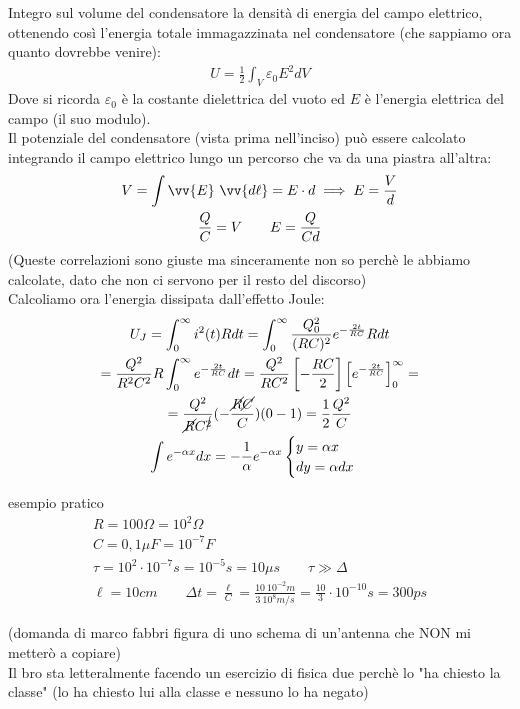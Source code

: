 \documentclass[a4paper, oneside]{article}
\begin{document}
Integro sul volume del condensatore la densità di energia del campo elettrico, ottenendo così l'energia totale immagazzinata nel condensatore (che sappiamo ora quanto dovrebbe venire):
\begin{gather*}
    U = \frac{1}{2} \int_V \varepsilon_0 E^2 dV
\end{gather*}
Dove si ricorda $\varepsilon_0$ è la costante dielettrica del vuoto ed $E$ è l'energia elettrica del campo (il suo modulo).\\
Il potenziale del condensatore (vista prima nell'inciso) può essere calcolato integrando il campo elettrico lungo un percorso che va da una piastra all'altra:
\begin{gather*}
    V = \int \vv{E} \ \vv{d\ell} = E \cdot d \implies E = \frac{V}{d}\\
    \frac{Q}{C} = V \qquad E = \frac{Q}{C d}
\end{gather*}
\scriptsize(Queste correlazioni sono giuste ma sinceramente non so perchè le abbiamo calcolate, dato che non ci servono per il resto del discorso)\\\normalsize
Calcoliamo ora l'energia dissipata dall'effetto Joule:
\begin{gather*}
    U_J = \int_0^\infty i^2(t) R dt = \int_0^\infty \frac{Q_0^2}{(R C)^2} e^{-\frac{2t}{R C}} R dt \\
    = \frac{Q^2}{R^2 C^2} R \int_0^\infty e^{-\frac{2t}{R C}} dt = \frac{Q^2}{R C^2} \left[ -\frac{RC}{2} \right] \left[ e^{-\frac{2t}{RC}} \right]_0^\infty = \\
    = \frac{Q^2}{\cancel{R} C^{\cancel{2}}} (-\frac{\cancel{R}\cancel{C}}{C}) (0-1) = \frac{1}{2} \frac{Q^2}{C}\\
    \int e^{-\alpha x} dx = -\frac{1}{\alpha} e^{-\alpha x}
    \begin{cases}
        y = \alpha x\\
        dy = \alpha dx\\
    \end{cases}
\end{gather*}
\begin{example}
    esempio pratico\\
    \begin{gather*}
        R = 100 \Omega = 10^2 \Omega\\
        C = 0,1 \mu F = 10^{-7} F\\
        \tau = 10^2 \cdot 10^{-7} s = 10^{-5} s = 10 \mu s \qquad \tau \gg \Delta \\
        \ell = 10 cm \qquad \Delta t = \frac{\ell}{C} = \frac{10 \ 10^{-2} m}{3 \ 10^8 m/s} = \frac{10}{3} \cdot 10^{-10} s = 300 ps
    \end{gather*}
\end{example}\noindent
(domanda di marco fabbri figura di uno schema di un'antenna che NON mi metterò a copiare)\\
Il bro sta letteralmente facendo un esercizio di fisica due perchè lo "ha chiesto la classe" (lo ha chiesto lui alla classe e nessuno lo ha negato)
\end{document}
